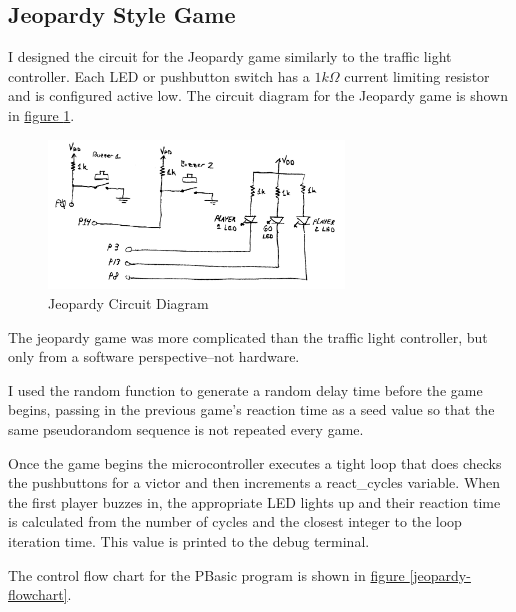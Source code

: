 \documentclass[11pt]{article}
\begin{document}
\subsection{Jeopardy Style Game}

I designed the circuit for the Jeopardy game similarly to the traffic light controller.
Each LED or pushbutton switch has a $1k\Omega$ current limiting resistor and is configured active low.
The circuit diagram for the Jeopardy game is shown in \hyperref[jeopardy-circuit]{figure \ref{jeopardy-circuit}}.

\begin{figure}[h!]
\centering
\includegraphics[width=0.7\textwidth]{jeopardy-circuit.pdf}
\caption{Jeopardy Circuit Diagram}
\label{jeopardy-circuit}
\end{figure}

The jeopardy game was more complicated than the traffic light controller,
but only from a software perspective--not hardware.

I used the random function to generate a random delay time before the game begins,
passing in the previous game's reaction time as a seed value so that the same
pseudorandom sequence is not repeated every game.

Once the game begins the microcontroller executes a tight loop that does checks the pushbuttons
for a victor and then increments a react\_cycles variable.
When the first player buzzes in, the appropriate LED lights up and their reaction
time is calculated from the number of cycles and the closest integer to the loop iteration time.
This value is printed to the debug terminal.

The control flow chart for the PBasic program is shown in \hyperref[jeopardy-flowchart]{figure \ref{jeopardy-flowchart}}.
\end{document}
